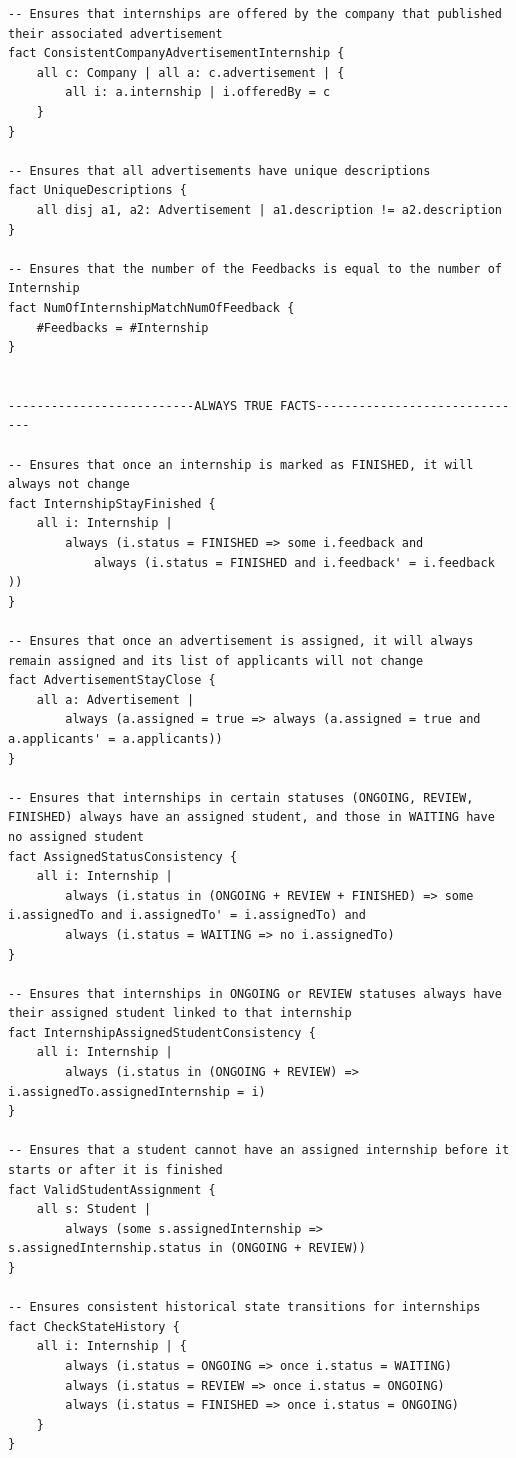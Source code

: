\begin{lstlisting}
-- Ensures that internships are offered by the company that published their associated advertisement
fact ConsistentCompanyAdvertisementInternship {
    all c: Company | all a: c.advertisement | {
        all i: a.internship | i.offeredBy = c
    }
}

-- Ensures that all advertisements have unique descriptions
fact UniqueDescriptions {
    all disj a1, a2: Advertisement | a1.description != a2.description
}

-- Ensures that the number of the Feedbacks is equal to the number of Internship
fact NumOfInternshipMatchNumOfFeedback {
	#Feedbacks = #Internship
}


--------------------------ALWAYS TRUE FACTS------------------------------

-- Ensures that once an internship is marked as FINISHED, it will always not change
fact InternshipStayFinished {
    all i: Internship | 
        always (i.status = FINISHED => some i.feedback and 
            always (i.status = FINISHED and i.feedback' = i.feedback ))
}

-- Ensures that once an advertisement is assigned, it will always remain assigned and its list of applicants will not change
fact AdvertisementStayClose {
    all a: Advertisement |
        always (a.assigned = true => always (a.assigned = true and a.applicants' = a.applicants))
}

-- Ensures that internships in certain statuses (ONGOING, REVIEW, FINISHED) always have an assigned student, and those in WAITING have no assigned student
fact AssignedStatusConsistency {
    all i: Internship |
        always (i.status in (ONGOING + REVIEW + FINISHED) => some i.assignedTo and i.assignedTo' = i.assignedTo) and
        always (i.status = WAITING => no i.assignedTo)
}

-- Ensures that internships in ONGOING or REVIEW statuses always have their assigned student linked to that internship
fact InternshipAssignedStudentConsistency {
    all i: Internship |
        always (i.status in (ONGOING + REVIEW) => i.assignedTo.assignedInternship = i)
}

-- Ensures that a student cannot have an assigned internship before it starts or after it is finished
fact ValidStudentAssignment {
    all s: Student | 
        always (some s.assignedInternship => s.assignedInternship.status in (ONGOING + REVIEW))
}

-- Ensures consistent historical state transitions for internships
fact CheckStateHistory {
    all i: Internship | {
        always (i.status = ONGOING => once i.status = WAITING)
        always (i.status = REVIEW => once i.status = ONGOING)
        always (i.status = FINISHED => once i.status = ONGOING)
    }
}


\end{lstlisting}
